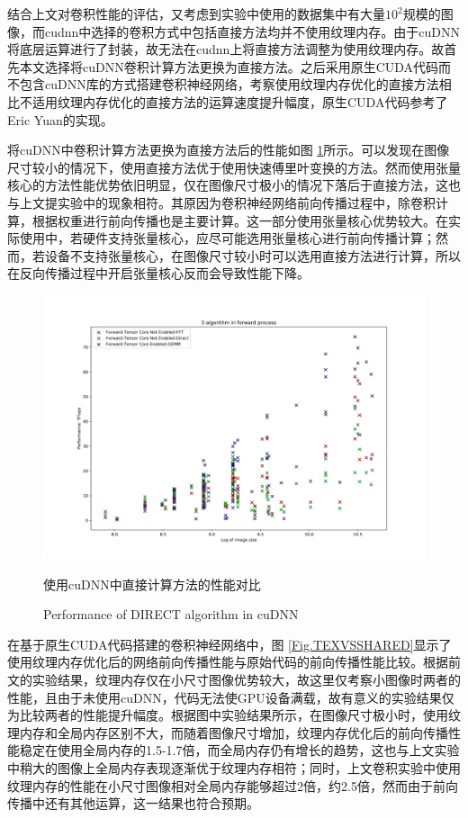 \par 结合上文对卷积性能的评估，又考虑到实验中使用的数据集中有大量$ 10^2 $规模的图像，而cudnn中选择的卷积方式中包括直接方法均并不使用纹理内存。由于cuDNN将底层运算进行了封装，故无法在cudnn上将直接方法调整为使用纹理内存。故首先本文选择将cuDNN卷积计算方法更换为直接方法。之后采用原生CUDA代码而不包含cuDNN库的方式搭建卷积神经网络，考察使用纹理内存优化的直接方法相比不适用纹理内存优化的直接方法的运算速度提升幅度，原生CUDA代码参考了Eric Yuan的实现\cite{ERICYUAN}。
\par 将cuDNN中卷积计算方法更换为直接方法后的性能如图 \ref{Fig.CNNDIRECT}所示。可以发现在图像尺寸较小的情况下，使用直接方法优于使用快速傅里叶变换的方法。然而使用张量核心的方法性能优势依旧明显，仅在图像尺寸极小的情况下落后于直接方法，这也与上文提实验中的现象相符。其原因为卷积神经网络前向传播过程中，除卷积计算，根据权重进行前向传播也是主要计算。这一部分使用张量核心优势较大。在实际使用中，若硬件支持张量核心，应尽可能选用张量核心进行前向传播计算；然而，若设备不支持张量核心，在图像尺寸较小时可以选用直接方法进行计算，所以在反向传播过程中开启张量核心反而会导致性能下降。
\begin{figure}
	\centering
	\includegraphics[width=15cm]{figures/CNN-HALF-3ALGOFWD.jpg}
	\renewcommand{\thefigure}{\arabic{section}-\arabic{figure} }
	\renewcommand{\figurename}{图}
	\caption{使用cuDNN中直接计算方法的性能对比}
	\addtocounter{figure}{-1}
	\renewcommand{\thefigure}{\arabic{section}-\arabic{figure} }
	\renewcommand{\figurename}{Figure}
	\caption{Performance of DIRECT algorithm in cuDNN}
	\label{Fig.CNNDIRECT}
\end{figure}
\par 在基于原生CUDA代码搭建的卷积神经网络中，图 \ref{Fig.TEXVSSHARED}显示了使用纹理内存优化后的网络前向传播性能与原始代码的前向传播性能比较。根据前文的实验结果，纹理内存仅在小尺寸图像优势较大，故这里仅考察小图像时两者的性能，且由于未使用cuDNN，代码无法使GPU设备满载，故有意义的实验结果仅为比较两者的性能提升幅度。根据图中实验结果所示，在图像尺寸极小时，使用纹理内存和全局内存区别不大，而随着图像尺寸增加，纹理内存优化后的前向传播性能稳定在使用全局内存的1.5-1.7倍，而全局内存仍有增长的趋势，这也与上文实验中稍大的图像上全局内存表现逐渐优于纹理内存相符；同时，上文卷积实验中使用纹理内存的性能在小尺寸图像相对全局内存能够超过2倍，约2.5倍，然而由于前向传播中还有其他运算，这一结果也符合预期。
